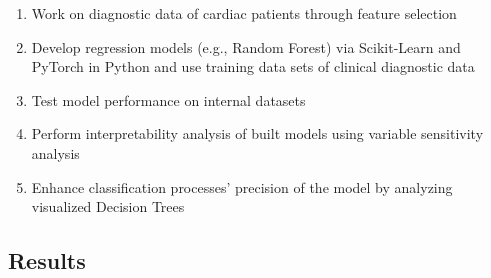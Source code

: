 \documentclass[12pt]{article}
\begin{document}
\begin{enumerate}

    \item{\small Work on diagnostic data of cardiac patients through feature selection}
    \item{\small Develop regression models (e.g., Random Forest) via Scikit-Learn and PyTorch in Python and use training data sets of clinical diagnostic data}
    \item{\small Test model performance on internal datasets}
    \item{\small Perform interpretability analysis of built models using variable sensitivity analysis}
    \item{\small Enhance classification processes' precision of the model by analyzing visualized Decision Trees}

\end{enumerate}

\subsection{Results}
\end{document}
